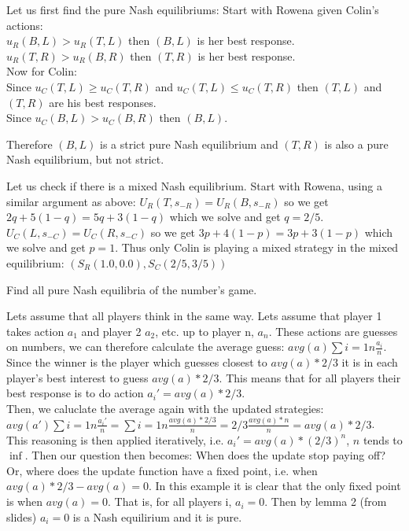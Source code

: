 \documentclass[12pt]{article}
\newenvironment{question}[2][Question]{\begin{trivlist}
\item[\hskip \labelsep {\bfseries #1}\hskip \labelsep {\bfseries #2.}]}{\end{trivlist}}
\newenvironment{answer}[2][Answer]{\begin{trivlist}
\item[\hskip \labelsep {\bfseries #1}\hskip \labelsep {\bfseries #2:}]}{\end{trivlist}}
\begin{document}
\begin{answer}{b)}
Let us first find the pure Nash equilibriums: Start with Rowena given Colin's actions: \\
$u_R(B,L) > u_R(T,L)$ then $(B,L)$ is her best response. \\
$u_R(T,R) > u_R(B,R)$ then $(T,R)$ is her best response. \\
Now for Colin: \\
Since $u_C(T,L) \geq u_C(T,R)$ and $u_C(T,L) \leq u_C(T,R)$ then $(T,L)$ and $(T,R)$ are his best responses. \\
Since $u_C(B,L) > u_C(B,R)$ then $(B,L)$.

Therefore $(B,L)$ is a strict pure Nash equilibrium and $(T,R)$ is also a pure Nash equilibrium, but not strict.

Let us check if there is a mixed Nash equilibrium. Start with Rowena, using a similar argument as above:
$U_R(T,s_{-R})=U_R(B,s_{-R})$ so we get $2q+5(1-q)=5q+3(1-q)$ which we solve and get $q=2/5$.
$U_C(L,s_{-C})=U_C(R,s_{-C})$ so we get $3p+4(1-p)=3p+3(1-p)$ which we solve and get $p=1$.
Thus only Colin is playing a mixed strategy in the mixed equilibrium: $(S_R(1.0,0.0), S_C(2/5,3/5))$

\end{answer}
\begin{question}{2}
Find all pure Nash equilibria of the number's game.
\end{question}
\begin{answer}{a)}
Lets assume that all players think in the same way.
Lets assume that player 1 takes action $a_1$ and player 2 $a_2$, etc. up to player n, $a_n$.
These actions are guesses on numbers, we can therefore calculate the average guess: $avg(a)\sum{i=1}{n}{\frac{a_i}{n}}$. Since the winner is the player which guesses closest to $avg(a)*2/3$ it is in each player's best interest to guess $avg(a)*2/3$.
This means that for all players their best response is to do action $a_i'=avg(a)*2/3$. \\
Then, we caluclate the average again with the updated strategies: \\
$avg(a')\sum{i=1}{n}{\frac{a_i'}{n}}=\sum{i=1}{n}{\frac{avg(a)*2/3}{n}}=2/3\frac{avg(a)*n}{n}=avg(a)*2/3$. \\
This reasoning is then applied iteratively, i.e. $a_i'=avg(a)*(2/3)^n$, $n$ tends to $\inf$. Then our question then becomes: When does the update stop paying off? Or, where does the update function have a fixed point, i.e. when $avg(a)*2/3 - avg(a)=0$.
In this example it is clear that the only fixed point is when $avg(a)=0$. That is, for all players i, $a_i=0$.
Then by lemma 2 (from slides) $a_i=0$ is a Nash equilirium and it is pure.
\end{answer}
\end{document}
